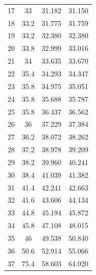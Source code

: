 \begin{table}[H]
\begin{tabular}{cccc}
    17         & 33                        & 31.182                & 31.150                 \\
    18         & 33.2                      & 31.775                & 31.759                 \\
    19         & 33.2                      & 32.380                & 32.380                 \\
    20         & 33.8                      & 32.999                & 33.016                 \\
    21         & 34                        & 33.635                & 33.670                 \\
    22         & 35.4                      & 34.293                & 34.347                 \\
    23         & 35.8                      & 34.975                & 35.051                 \\
    24         & 35.8                      & 35.688                & 35.787                 \\
    25         & 35.8                      & 36.437                & 36.562                 \\
    26         & 36                        & 37.229                & 37.384                 \\
    27         & 36.2                      & 38.072                & 38.262                 \\
    28         & 37.2                      & 38.978                & 39.209                 \\
    29         & 38.2                      & 39.960                & 40.241                 \\
    30         & 38.4                      & 41.039                & 41.382                 \\
    31         & 41.4                      & 42.241                & 42.663                 \\
    32         & 41.6                      & 43.606                & 44.134                 \\
    33         & 44.8                      & 45.194                & 45.872                 \\
    34         & 45.8                      & 47.108                & 48.015                 \\
    35         & 46                        & 49.538                & 50.840                 \\
    36         & 50.6                      & 52.914                & 55.066                 \\
    37         & 75.4                      & 58.603                & 64.020          \\
    \bottomrule      
    \end{tabular}
    \end{table}

